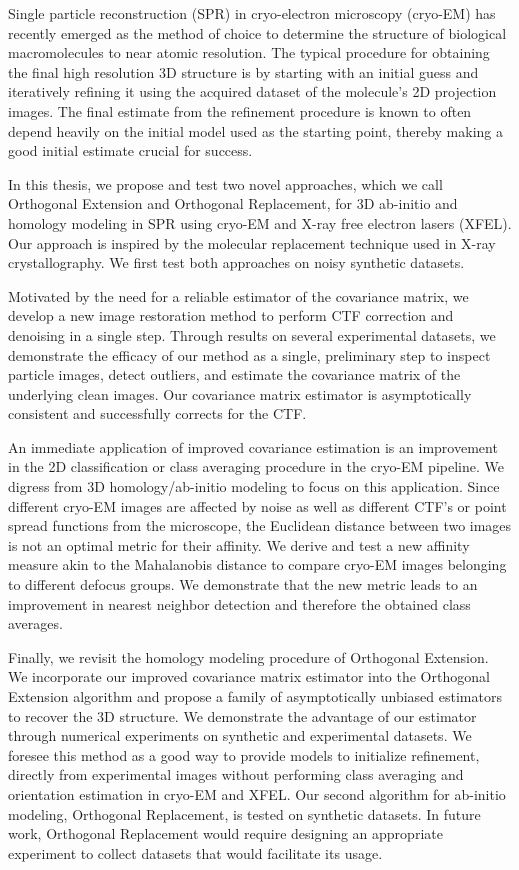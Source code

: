 \documentclass{article}
\begin{document}
Single particle reconstruction (SPR) in cryo-electron microscopy (cryo-EM) has recently emerged as the method of choice to determine the structure of biological macromolecules to near atomic resolution. The typical procedure for obtaining the final high resolution 3D structure is by starting with an initial guess and iteratively refining it using the acquired dataset of the molecule's 2D projection images. The final estimate from the refinement procedure is known to often depend heavily on the initial model used as the starting point, thereby making a good initial estimate crucial for success.

In this thesis, we propose and test two novel approaches, which we call Orthogonal Extension and Orthogonal Replacement, for 3D ab-initio and homology modeling in SPR using cryo-EM and X-ray free electron lasers (XFEL). Our approach is inspired by the molecular replacement technique used in X-ray crystallography. We first test both approaches on noisy synthetic datasets.

Motivated by the need for a reliable estimator of the covariance matrix, we develop a new image restoration method to perform CTF correction and denoising in a single step. Through results on several experimental datasets, we demonstrate the efficacy of our method as a single, preliminary step to inspect particle images, detect outliers, and estimate the covariance matrix of the underlying clean images. Our covariance matrix estimator is asymptotically consistent and successfully corrects for the CTF.

An immediate application of improved covariance estimation is an improvement in the 2D classification or class averaging procedure in the cryo-EM pipeline. We digress from 3D homology/ab-initio modeling to focus on this application. Since different cryo-EM images are affected by noise as well as different CTF's or point spread functions from the microscope, the Euclidean distance between two images is not an optimal metric for their affinity. We derive and test a new affinity measure akin to the Mahalanobis distance to compare cryo-EM images belonging to different defocus groups. We demonstrate that the new metric leads to an improvement in nearest neighbor detection and therefore the obtained class averages.

Finally, we revisit the homology modeling procedure of Orthogonal Extension. We incorporate our improved covariance matrix estimator into the Orthogonal Extension algorithm and propose a family of asymptotically unbiased estimators to recover the 3D structure. We demonstrate the advantage of our estimator through numerical experiments on synthetic and experimental datasets. We foresee this method as a good way to provide models to initialize refinement, directly from experimental images without performing class averaging and orientation estimation in cryo-EM and XFEL. Our second algorithm for ab-initio modeling, Orthogonal Replacement, is tested on synthetic datasets. In future work, Orthogonal Replacement would require designing an appropriate experiment to collect datasets that would facilitate its usage.  
\end{document}
